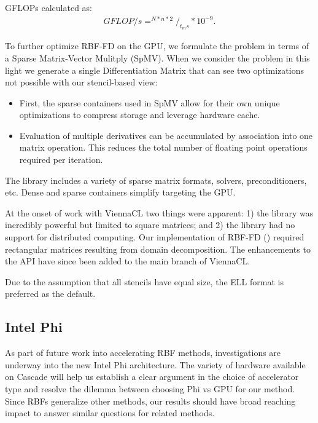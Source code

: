 \documentclass{report}
\begin{document}
GFLOPs calculated as: 
\begin{align}
GFLOP/s = ^{N * n * 2} /_{t_ms} * 10^{-9}. 
\end{align}



To further optimize RBF-FD on the GPU, we formulate the problem in terms of a Sparse Matrix-Vector Mulitply (SpMV). When we consider the problem in this light we generate a single Differentiation Matrix that can see two optimizations not possible with our stencil-based view: 
\begin{itemize} 
\item First, the sparse containers used in SpMV allow for their own unique optimizations to compress storage and leverage hardware cache.
\item Evaluation of multiple derivatives can be accumulated by association into one matrix operation. This reduces the total number of floating point operations required per iteration. 
\end{itemize}


The library includes a variety of sparse matrix formats, solvers, preconditioners, etc. Dense and sparse containers simplify targeting the GPU. 

At the onset of work with ViennaCL two things were apparent: 1) the library was incredibly powerful but limited to square matrices; and 2) the library had no support for distributed computing. Our implementation of RBF-FD (\cite{BolligRBFFDGPU}) required rectangular matrices resulting from domain decomposition. The enhancements to the API have since been added to the main branch of ViennaCL. 









Due to the assumption that all stencils have equal size, the ELL format is preferred as the default. 
 


\subsection{Intel Phi} 

As part of future work into accelerating RBF methods, investigations are underway into the new Intel Phi architecture. The variety of hardware available on Cascade will help us establish a clear argument in the choice of accelerator type and resolve the dilemma between choosing Phi vs GPU for our method. Since RBFs generalize other methods, our results should have broad reaching impact to answer similar questions for related methods.
\end{document}
